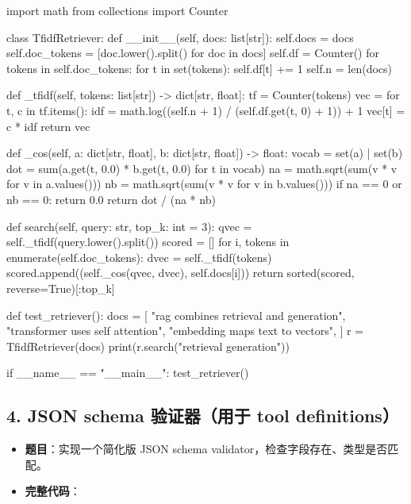 \begin{codeblock}
import math
from collections import Counter


class TfidfRetriever:
    def __init__(self, docs: list[str]):
        self.docs = docs
        self.doc_tokens = [doc.lower().split() for doc in docs]
        self.df = Counter()
        for tokens in self.doc_tokens:
            for t in set(tokens):
                self.df[t] += 1
        self.n = len(docs)

    def _tfidf(self, tokens: list[str]) -> dict[str, float]:
        tf = Counter(tokens)
        vec = {}
        for t, c in tf.items():
            idf = math.log((self.n + 1) / (self.df.get(t, 0) + 1)) + 1
            vec[t] = c * idf
        return vec

    def _cos(self, a: dict[str, float], b: dict[str, float]) -> float:
        vocab = set(a) | set(b)
        dot = sum(a.get(t, 0.0) * b.get(t, 0.0) for t in vocab)
        na = math.sqrt(sum(v * v for v in a.values()))
        nb = math.sqrt(sum(v * v for v in b.values()))
        if na == 0 or nb == 0:
            return 0.0
        return dot / (na * nb)

    def search(self, query: str, top_k: int = 3):
        qvec = self._tfidf(query.lower().split())
        scored = []
        for i, tokens in enumerate(self.doc_tokens):
            dvec = self._tfidf(tokens)
            scored.append((self._cos(qvec, dvec), self.docs[i]))
        return sorted(scored, reverse=True)[:top_k]


def test_retriever():
    docs = [
        "rag combines retrieval and generation",
        "transformer uses self attention",
        "embedding maps text to vectors",
    ]
    r = TfidfRetriever(docs)
    print(r.search("retrieval generation"))


if __name__ == "__main__":
    test_retriever()
\end{codeblock}

\subsection{4. JSON schema 验证器（用于 tool definitions）}
\begin{itemize}[leftmargin=2em]
\item \textbf{题目}：实现一个简化版 JSON schema validator，检查字段存在、类型是否匹配。
\item \textbf{完整代码}：
\end{itemize}


